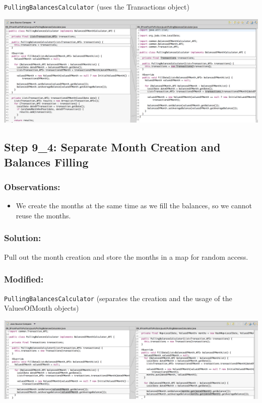 \documentclass[a4paper,fleqn,titlepage,11pt]{article}
\begin{document}
\texttt{PullingBalancesCalculator} (uses the Transactions object)

\includegraphics[width=1\textwidth]{CompareViews/09_2-09_3-2.png}

\subsection*{Step 9\_4: Separate Month Creation and Balances Filling}

\subsubsection*{Observations:}
\begin{itemize}
\item We create the months at the same time as we fill the balances, so we cannot reuse the months.
\end{itemize}

\subsubsection*{Solution:}

Pull out the month creation and store the months in a map for random access.

\subsubsection*{Modified:}

\texttt{PullingBalancesCalculator} (separates the creation and the usage of the ValuesOfMonth objects)

\includegraphics[width=1\textwidth]{CompareViews/09_3-09_4.png}
\end{document}
